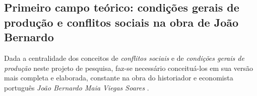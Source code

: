 \subsection[Primeiro campo teórico: condições gerais de produção e conflitos sociais na obra de João Bernardo]{Primeiro campo teórico: condições gerais de produção e conflitos sociais na obra de João Bernardo}
\label{subsec:cgpcsjobe}

Dada a centralidade dos conceitos de \textit{conflitos sociais} e de \textit{condições gerais de produção} neste projeto de pesquisa, faz-se necessário conceituá-los em sua versão mais completa e elaborada, constante na obra do historiador e economista português \textit{João Bernardo Maia Viegas Soares} \cite{BERNARDO1975, BERNARDO1977a, BERNARDO1977b, BERNARDO1977c, bernardo_inimigo_1979, BERNARDO1987, BERNARDO1991a, BERNARDO1991, BERNARDO1995, BERNARDO1997, BERNARDO1998, BERNARDO2002, bernardo_fascismo_2003, bernardo_capitalismo_2008, bernardo_fascismo_2015}. 


